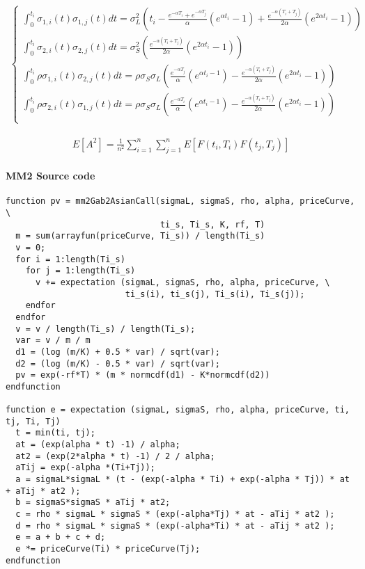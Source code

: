 \documentclass[12pt,a4paper,hidelinks,fleqn]{article}            %
\begin{document}
\begin{align*}
\begin{cases}
\int_0^{t_i} \sigma_{1,i} (t) \sigma_{1, j} (t) dt = \sigma_L^2\left( 
t_i - \frac{e^{-\alpha T_i} + e^{-\alpha T_j}}{\alpha} (e^{\alpha t_i} - 1) + \frac{e^{-\alpha(T_i + T_j)}}{2\alpha} (e^{2\alpha t_i} - 1)
\right)\\
\int_0^{t_i} \sigma_{2,i} (t) \sigma_{2, j} (t) dt = \sigma_S^2 \left(\frac{e^{-\alpha(T_i + T_j)}}{2\alpha} (e^{2\alpha t_i} - 1)\right) \\
\int_0^{t_i} \rho \sigma_{1,i} (t) \sigma_{2, j} (t) dt = \rho \sigma_S \sigma_L \left( \frac{e^{-\alpha T_j}}{\alpha} (e^{\alpha t_i - 1}) - \frac{e^{ - \alpha(T_i + T_j)}}{2\alpha}(e^{2\alpha t_i} - 1)\right) \\
\int_0^{t_i} \rho \sigma_{2,i} (t) \sigma_{1, j} (t) dt = \rho \sigma_S \sigma_L \left( \frac{e^{-\alpha T_i}}{\alpha} (e^{\alpha t_i - 1}) - \frac{e^{ - \alpha(T_i + T_j)}}{2\alpha}(e^{2\alpha t_i} - 1)\right)\\
\end{cases}
\end{align*}

\begin{align*}
E[A^2] = \frac{1}{n^2}\sum_{i=1}^n \sum_{j=1}^n E[F(t_i, T_i) F(t_j, T_j)] 
\end{align*}

\paragraph{MM2 Source code}
\begin{small}

\begin{verbatim}
function pv = mm2Gab2AsianCall(sigmaL, sigmaS, rho, alpha, priceCurve, \ 
							   ti_s, Ti_s, K, rf, T)
  m = sum(arrayfun(priceCurve, Ti_s)) / length(Ti_s)
  v = 0;
  for i = 1:length(Ti_s)
    for j = 1:length(Ti_s)
      v += expectation (sigmaL, sigmaS, rho, alpha, priceCurve, \
      		 		    ti_s(i), ti_s(j), Ti_s(i), Ti_s(j));
    endfor
  endfor
  v = v / length(Ti_s) / length(Ti_s);
  var = v / m / m
  d1 = (log (m/K) + 0.5 * var) / sqrt(var);
  d2 = (log (m/K) - 0.5 * var) / sqrt(var);
  pv = exp(-rf*T) * (m * normcdf(d1) - K*normcdf(d2))
endfunction

function e = expectation (sigmaL, sigmaS, rho, alpha, priceCurve, ti, tj, Ti, Tj)
  t = min(ti, tj);
  at = (exp(alpha * t) -1) / alpha;
  at2 = (exp(2*alpha * t) -1) / 2 / alpha;
  aTij = exp(-alpha *(Ti+Tj));
  a = sigmaL*sigmaL * (t - (exp(-alpha * Ti) + exp(-alpha * Tj)) * at + aTij * at2 );
  b = sigmaS*sigmaS * aTij * at2;
  c = rho * sigmaL * sigmaS * (exp(-alpha*Tj) * at - aTij * at2 );
  d = rho * sigmaL * sigmaS * (exp(-alpha*Ti) * at - aTij * at2 );
  e = a + b + c + d;
  e *= priceCurve(Ti) * priceCurve(Tj);
endfunction 
\end{verbatim}

\end{small}
\end{document}
